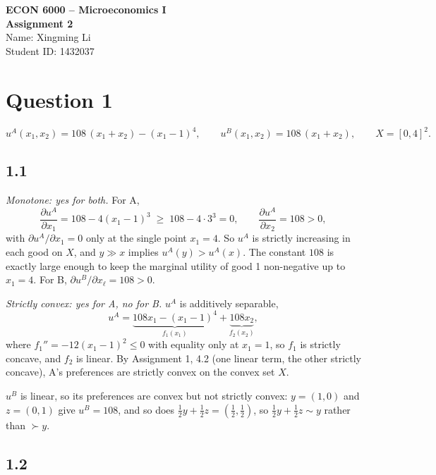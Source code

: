 \documentclass[12pt,letterpaper]{article}
\begin{document}
\begin{center}
  {\large\bfseries ECON 6000 -- Microeconomics I}\\[4pt]
  {\large\bfseries Assignment 2}\\[10pt]
  Name: Xingming Li\\
  Student ID: 1432037
\end{center}

\vspace{6pt}

\section*{Question 1}

\[
u^A(x_1,x_2) = 108\,(x_1+x_2) - (x_1-1)^4, \qquad u^B(x_1,x_2) = 108\,(x_1+x_2), \qquad X=[0,4]^2 .
\]

\subsection*{1.1}

\textit{Monotone: yes for both.} For A,
\[
\frac{\partial u^A}{\partial x_1} = 108 - 4(x_1-1)^3 \;\ge\; 108 - 4\cdot 3^3 = 0, \qquad \frac{\partial u^A}{\partial x_2} = 108>0,
\]
with $\partial u^A/\partial x_1=0$ only at the single point $x_1=4$. So $u^A$ is strictly increasing in each good on $X$, and $y\gg x$ implies $u^A(y)>u^A(x)$. The constant $108$ is exactly large enough to keep the marginal utility of good 1 non-negative up to $x_1=4$. For B, $\partial u^B/\partial x_\ell=108>0$.

\textit{Strictly convex: yes for A, no for B.} $u^A$ is additively separable,
\[
u^A = \underbrace{108x_1-(x_1-1)^4}_{f_1(x_1)} + \underbrace{108x_2}_{f_2(x_2)},
\]
where $f_1''=-12(x_1-1)^2\le 0$ with equality only at $x_1=1$, so $f_1$ is strictly concave, and $f_2$ is linear. By Assignment 1, 4.2 (one linear term, the other strictly concave), A's preferences are strictly convex on the convex set $X$.

$u^B$ is linear, so its preferences are convex but not strictly convex: $y=(1,0)$ and $z=(0,1)$ give $u^B=108$, and so does $\tfrac12y+\tfrac12z=(\tfrac12,\tfrac12)$, so $\tfrac12y+\tfrac12z\sim y$ rather than $\succ y$.

\subsection*{1.2}
\end{document}
